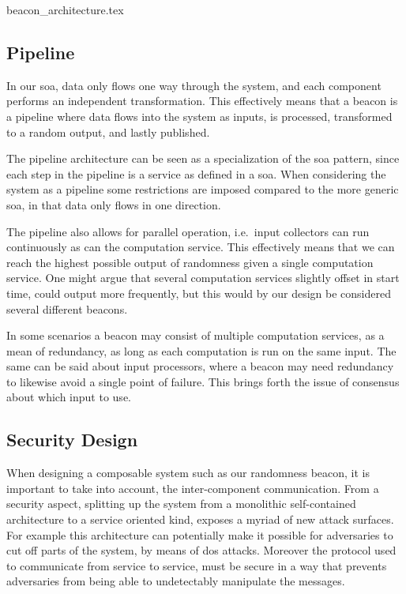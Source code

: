 {beacon_architecture.tex}

\subsection{Pipeline}%
\label{sub:pipeline}
In our \gls{soa}, %
data only flows one way through the system, and each component performs an independent transformation.
This effectively means that a beacon is a pipeline where data flows into the system as inputs, is processed, transformed to a random output, and lastly published.

The pipeline architecture can be seen as a specialization of the \gls{soa} pattern, since each step in the pipeline is a service as defined in a \gls{soa}.
When considering the system as a pipeline some restrictions are imposed compared to the more generic \gls{soa}, in that data only flows in one direction.

The pipeline also allows for parallel operation, i.e.\ input collectors can run continuously as can the computation service.
This effectively means that we can reach the highest possible output of randomness given a single computation service.
One might argue that several computation services slightly offset in start time, could output more frequently, but this would by our design be considered several different beacons.

In some scenarios a beacon may consist of multiple computation services, as a mean of redundancy, as long as each computation is run on the same input.
The same can be said about input processors, where a beacon may need redundancy to likewise avoid a single point of failure.
This brings forth the issue of consensus about which input to use.


\subsection{Security Design}


When designing a composable system such as our randomness beacon, it is important to take into account, the inter-component communication.
From a security aspect, splitting up the system from a monolithic self-contained architecture to a service oriented kind, exposes a myriad of new attack surfaces.
For example this architecture can potentially make it possible for adversaries to cut off parts of the system, by means of \gls{dos} attacks.
Moreover the protocol used to communicate from service to service, must be secure in a way that prevents adversaries from being able to undetectably manipulate the messages.

